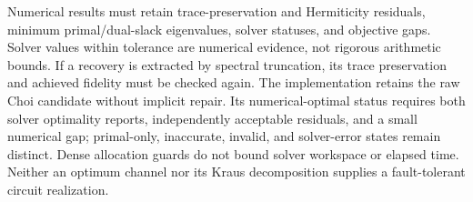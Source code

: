 Numerical results must retain trace-preservation and Hermiticity
residuals, minimum primal/dual-slack eigenvalues, solver statuses, and
objective gaps. Solver values within tolerance are numerical evidence,
not rigorous arithmetic bounds. If a recovery is extracted by spectral
truncation, its trace preservation and achieved fidelity must be checked
again. The implementation retains the raw Choi candidate without implicit repair.
Its numerical-optimal status requires both solver optimality reports,
independently acceptable residuals, and a small numerical gap; primal-only,
inaccurate, invalid, and solver-error states remain distinct. Dense
allocation guards do not bound solver workspace or elapsed time. Neither
an optimum channel nor its Kraus decomposition supplies a fault-tolerant
circuit realization.
